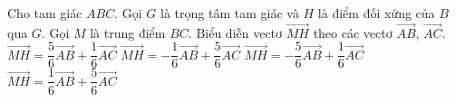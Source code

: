 \begin{ex}%
	Cho tam giác $ABC$. Gọi $G$ là trọng tâm tam giác và $H$ là điểm đối xứng của $B$ qua $G$. Gọi $M$ là trung điểm $BC$. Biểu diễn vectơ $\overrightarrow{MH}$ theo các vectơ $\overrightarrow{AB}$, $\overrightarrow{AC}$.
	\choice
	{$\overrightarrow{MH}=\dfrac{5}{6}\overrightarrow{AB}+\dfrac{1}{6}\overrightarrow{AC}$}
	{$\overrightarrow{MH}=-\dfrac{1}{6}\overrightarrow{AB}+\dfrac{5}{6}\overrightarrow{AC}$}
	{\True $\overrightarrow{MH}=-\dfrac{5}{6}\overrightarrow{AB}+\dfrac{1}{6}\overrightarrow{AC}$}
	{$\overrightarrow{MH}=\dfrac{1}{6}\overrightarrow{AB}+\dfrac{5}{6}\overrightarrow{AC}$}
\end{ex}

